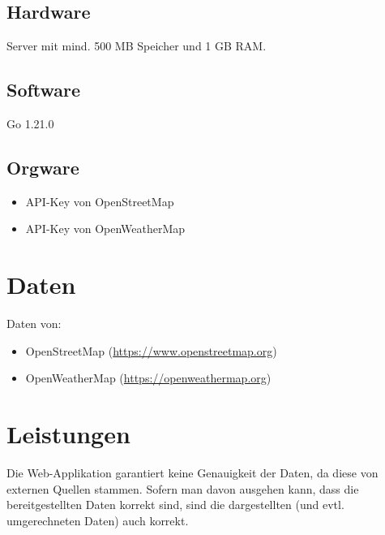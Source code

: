 \documentclass[a4paper]{scrreprt}
\begin{document}
\section{Hardware}
Server mit mind. 500 MB Speicher und 1 GB RAM.

\section{Software}
Go 1.21.0

\section{Orgware}
\begin{itemize}
    \item API-Key von OpenStreetMap
    \item API-Key von OpenWeatherMap
\end{itemize}


\chapter{Daten}
Daten von:
\begin{itemize}
    \item OpenStreetMap (\url{https://www.openstreetmap.org})
    \item OpenWeatherMap (\url{https://openweathermap.org})
\end{itemize}

\chapter{Leistungen}
Die Web-Applikation garantiert keine Genauigkeit der Daten, da diese von externen Quellen stammen. Sofern man davon ausgehen kann, dass die bereitgestellten Daten korrekt sind, sind die dargestellten (und evtl. umgerechneten Daten) auch korrekt.
\end{document}
